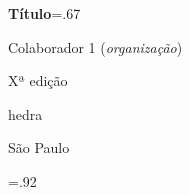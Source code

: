 




\begingroup\thispagestyle{empty}\vspace*{-.01\textheight}\parindent=0pt 
              \formular
              \Huge 
              \textbf{Título}\baselineskip=.67\baselineskip 

              \vspace{15mm}
              
              
              \vspace{5cm}

              \newfontfamily{}
              {\selectfont\minion\small
              Colaborador 1 (\textit{organização})}
              
              {\selectfont\minion\footnotesize
              Xª edição}
                    
              \vfill

              \newfontfamily{}
              {\fontsize{30}{40}\selectfont \timesnewroman hedra}
              
              \medskip

              {\selectfont\minion\small
              São Paulo \quad\the\year}
\endgroup
\pagebreak

\begingroup 

\footnotesize\parindent0pt\parskip5pt\thispagestyle{empty} 
\vspace*{.1\textheight}\mbox{} \vfill
\baselineskip=.92\baselineskip
\thispagestyle{empty}

